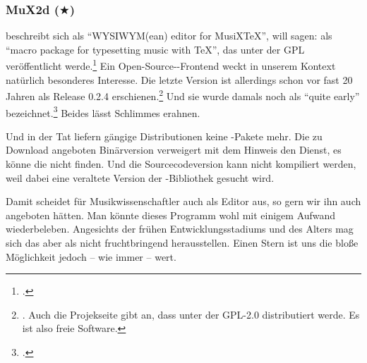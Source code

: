 %
%
%



\subsubsection{MuX2d ($\bigstar$)}

\label{MuX2d} beschreibt sich als \enquote{WYSIWYM(ean) editor for
MusiXTeX}, will sagen: als \enquote{macro package for typesetting music with
TeX}, das unter der GPL veröffentlicht werde.\footcite[vgl.][\nopage
wp]{Mux2d2000a} Ein Open-Source--Frontend weckt in unserem
Kontext natürlich besonderes Interesse. Die letzte Version ist allerdings schon
vor fast 20 Jahren als Release 0.2.4 erschienen.\footnote{\cite[vgl.][\nopage
wp]{Mux2d2000b}. Auch die Projekseite gibt an, dass  unter der GPL-2.0
distributiert werde. Es ist also freie Software.} Und sie wurde damals noch als
\enquote{quite early} bezeichnet.\footcite[vgl.][\nopage wp]{Mux2d2000a} Beides
lässt Schlimmes erahnen.

Und in der Tat liefern gängige Distributionen keine -Pakete mehr. Die
zu Download angeboten Binärversion verweigert mit dem Hinweis den Dienst, es
könne die  nicht finden. Und die Sourcecodeversion kann nicht
kompiliert werden, weil dabei eine veraltete Version der -Bibliothek
gesucht wird.

Damit scheidet für Musikwissenschaftler auch  als Editor aus, so gern
wir ihn auch angeboten hätten. Man könnte dieses Programm wohl mit einigem
Aufwand wiederbeleben. Angesichts der frühen Entwicklungsstadiums und des Alters
mag sich das aber als nicht fruchtbringend herausstellen. Einen Stern ist uns
die bloße Möglichkeit jedoch -- wie immer -- wert.
%
